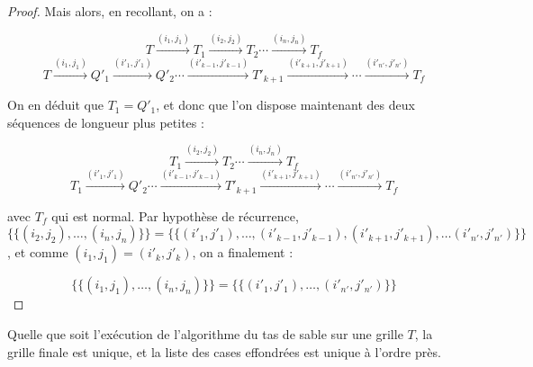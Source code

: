 \begin{proof}
Mais alors, en recollant, on a : 

$$T\xrightarrow{(i_1,j_1)}T_1\xrightarrow{(i_2,j_2)}T_2\cdots\xrightarrow{(i_n,j_n)}T_f$$
$$T\xrightarrow{(i_1,j_1)}Q'_1\xrightarrow{(i'_1,j'_1)}Q'_2\cdots\xrightarrow{(i'_{k-1},j'_{k-1})}T'_{k+1}\xrightarrow{(i'_{k+1},j'_{k+1})}\cdots\xrightarrow{(i'_{n'},j'_{n'})}T_f$$

On en déduit que $T_1=Q'_1$, et donc que l'on dispose maintenant des deux séquences de longueur plus petites : 

$$T_1\xrightarrow{(i_2,j_2)}T_2\cdots\xrightarrow{(i_n,j_n)}T_f$$
$$T_1\xrightarrow{(i'_1,j'_1)}Q'_2\cdots\xrightarrow{(i'_{k-1},j'_{k-1})}T'_{k+1}\xrightarrow{(i'_{k+1},j'_{k+1})}\cdots\xrightarrow{(i'_{n'},j'_{n'})}T_f$$

avec $T_f$ qui est normal. Par hypothèse de récurrence,\\
$\{\!\!\{(i_2, j_2), \ldots, (i_n, j_n) \}\!\!\}=\{\!\!\{(i'_1, j'_1), \ldots, (i'_{k-1},j'_{k-1}), (i'_{k+1},j'_{k+1}), \ldots (i'_{n'}, j'_{n'}) \}\!\!\}$, et comme $(i_1, j_1)=(i'_k, j'_k)$, on a finalement : 

$$\{\!\!\{(i_1, j_1), \ldots, (i_n, j_n) \}\!\!\}=\{\!\!\{(i'_1, j'_1), \ldots, (i'_{n'}, j'_{n'}) \}\!\!\}$$


\end{proof}


\begin{coro}
Quelle que soit l'exécution de l'algorithme du tas de sable sur une grille $T$, la grille finale est unique, et la liste des cases effondrées est unique à l'ordre près.
\end{coro}

